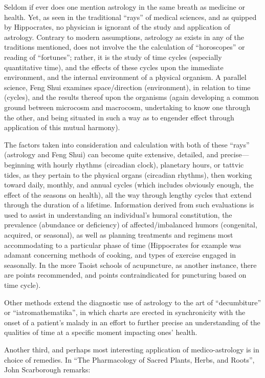 Seldom if ever does one mention astrology in the same breath as medicine or health. Yet, as seen in the traditional ``rays'' of medical sciences, and as quipped by Hippocrates, no physician is ignorant of the study and application of astrology. Contrary to modern assumptions, astrology as exists in any of the traditions mentioned, does not involve the the calculation of ``horoscopes'' or reading of ``fortunes''; rather, it is the study of time cycles (especially quantitative time), and the effects of these cycles upon the immediate environment, and the internal environment of a physical organism. A parallel science, Feng Shui examines space/direction (environment), in relation to time (cycles), and the results thereof upon the organisms (again developing a common ground between microcosm and macrocosm, undertaking to know one through the other, and being situated in such a way as to engender effect through application of this mutual harmony).

The factors taken into consideration and calculation with both of these ``rays'' (astrology and Feng Shui) can become quite extensive, detailed, and precise---beginning with hourly rhythms (circadian clock), planetary hours, or tattvic tides, as they pertain to the physical organs (circadian rhythms), then working toward daily, monthly, and annual cycles (which includes obviously enough, the effect of the seasons on health), all the way through lengthy cycles that extend through the duration of a lifetime. Information derived from such evaluations is used to assist in understanding an individual's humoral constitution, the prevalence (abundance or deficiency) of affected/imbalanced humors (congenital, acquired, or seasonal), as well as planning treatments and regimens most accommodating to a particular phase of time (Hippocrates for example was adamant concerning methods of cooking, and types of exercise engaged in seasonally. In the more Taoist schools of acupuncture, as another instance, there are points recommended, and points contraindicated for puncturing based on time cycle).

Other methods extend the diagnostic use of astrology to the art of ``decumbiture'' or ``iatromathematika'', in which charts are erected in synchronicity with the onset of a patient's malady in an effort to further precise an understanding of the qualities of time at a specific moment impacting ones' health.

Another third, and perhaps most interesting application of medico-astrology is in choice of remedies. In ``The Pharmacology of Sacred Plants, Herbs, and Roots'', John Scarborough remarks:

